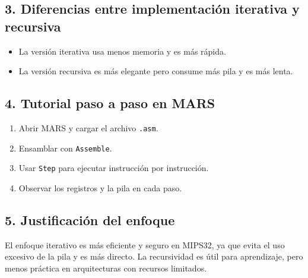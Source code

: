 \documentclass[12pt]{article}
\begin{document}
\subsection*{3. Diferencias entre implementación iterativa y recursiva}
\begin{itemize}
  \item La versión iterativa usa menos memoria y es más rápida.
  \item La versión recursiva es más elegante pero consume más pila y es más lenta.
\end{itemize}

\subsection*{4. Tutorial paso a paso en MARS}
\begin{enumerate}
  \item Abrir MARS y cargar el archivo \texttt{.asm}.
  \item Ensamblar con \texttt{Assemble}.
  \item Usar \texttt{Step} para ejecutar instrucción por instrucción.
  \item Observar los registros y la pila en cada paso.
\end{enumerate}

\subsection*{5. Justificación del enfoque}
El enfoque iterativo es más eficiente y seguro en MIPS32, ya que evita el uso excesivo de la pila y es más directo. La recursividad es útil para aprendizaje, pero menos práctica en arquitecturas con recursos limitados.
\end{document}
